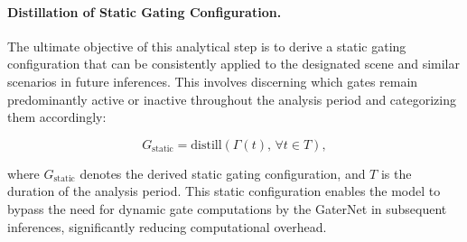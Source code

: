 \paragraph{Distillation of Static Gating Configuration.} The ultimate objective of this analytical step is to derive a static gating configuration that can be consistently applied to the designated scene and similar scenarios in future inferences. This involves discerning which gates remain predominantly active or inactive throughout the analysis period and categorizing them accordingly:

\begin{equation}
G_{\text{static}} = \text{distill}(\Gamma(t), \, \forall t \in T),
\label{eq:static_gating_configuration}
\end{equation}

\noindent{}where \(G_{\text{static}}\) denotes the derived static gating configuration, and \(T\) is the duration of the analysis period. This static configuration enables the model to bypass the need for dynamic gate computations by the GaterNet in subsequent inferences, significantly reducing computational overhead.

\clearpage
